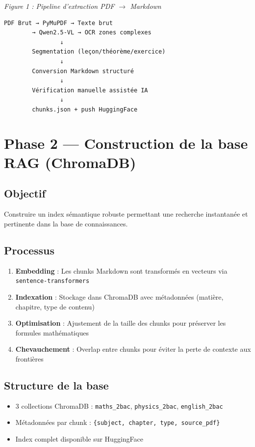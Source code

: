 \documentclass[12pt,a4paper]{report}
\begin{document}
\label{fig:pipeline-extraction}
\textit{Figure 1 : Pipeline d'extraction PDF $\rightarrow$ Markdown}
\begin{verbatim}
PDF Brut → PyMuPDF → Texte brut
        → Qwen2.5-VL → OCR zones complexes
                ↓
        Segmentation (leçon/théorème/exercice)
                ↓
        Conversion Markdown structuré
                ↓
        Vérification manuelle assistée IA
                ↓
        chunks.json + push HuggingFace
\end{verbatim}

\section{Phase 2 — Construction de la base RAG (ChromaDB)}

\subsection{Objectif}
Construire un index sémantique robuste permettant une recherche instantanée et pertinente dans la base de connaissances.

\subsection{Processus}
\begin{enumerate}
    \item \textbf{Embedding} : Les chunks Markdown sont transformés en vecteurs via \texttt{sentence-transformers}
    \item \textbf{Indexation} : Stockage dans ChromaDB avec métadonnées (matière, chapitre, type de contenu)
    \item \textbf{Optimisation} : Ajustement de la taille des chunks pour préserver les formules mathématiques
    \item \textbf{Chevauchement} : Overlap entre chunks pour éviter la perte de contexte aux frontières
\end{enumerate}

\subsection{Structure de la base}
\begin{itemize}
    \item 3 collections ChromaDB : \texttt{maths\_2bac}, \texttt{physics\_2bac}, \texttt{english\_2bac}
    \item Métadonnées par chunk : \texttt{\{subject, chapter, type, source\_pdf\}}
    \item Index complet disponible sur HuggingFace
\end{itemize}
\end{document}
